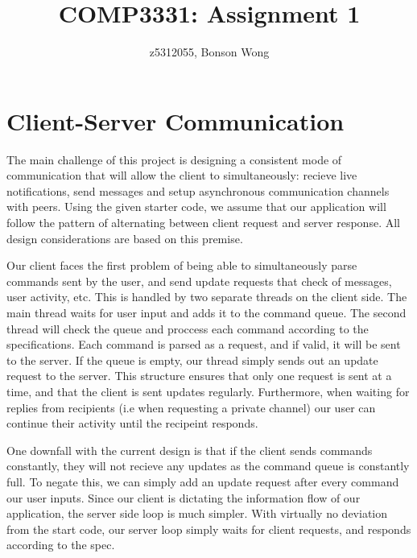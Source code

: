\documentclass[12pt, ]{article}
\title{COMP3331: Assignment 1}
\author{z5312055, Bonson Wong}
\begin{document}
\maketitle


\section{Client-Server Communication}

\begin{flushleft}
	The main challenge of this project is designing a consistent mode of communication that will allow the client to simultaneously: recieve live notifications, send messages and setup asynchronous communication channels with peers. 
	Using the given starter code, we assume that our application will follow the pattern of alternating between client request and server response. 
	All design considerations are based on this premise.
\end{flushleft}

\begin{flushleft}
	Our client faces the first problem of being able to simultaneously parse commands sent by the user, and send update requests that check of messages, user activity, etc.
	This is handled by two separate threads on the client side. The main thread waits for user input and adds it to the command queue. 
	The second thread will check the queue and proccess each command according to the specifications. Each command is parsed as a request, and if valid, it will be sent to the server.
	If the queue is empty, our thread simply sends out an update request to the server.
	This structure ensures that only one request is sent at a time, and that the client is sent updates regularly.
	Furthermore, when waiting for replies from recipients (i.e when requesting a private channel) our user can continue their activity until the recipeint responds.
\end{flushleft}

\begin{flushleft}
	One downfall with the current design is that if the client sends commands constantly, they will not recieve any updates as the command queue is constantly full.
	To negate this, we can simply add an update request after every command our user inputs.
	Since our client is dictating the information flow of our application, the server side loop is much simpler. With virtually no deviation from the start code, our server loop simply waits for client requests, and responds according to the spec.
\end{flushleft}
\end{document}
